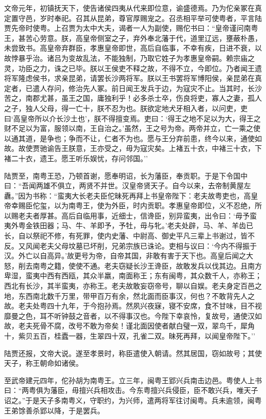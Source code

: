 \documentclass[]{article}
\begin{document}
文帝元年，初镇抚天下，使告诸侯四夷从代来即位意，谕盛德焉。乃为佗亲冢在真定置守邑，岁时奉祀。召其从昆弟，尊官厚赐宠之。召丞相平举可使粤者，平言陆贾先帝时使粤。上召贾为太中大夫，谒者一人为副使，赐佗书曰：``皇帝谨问南粤王，甚苦心劳意。朕，高皇帝侧室之子，弃外奉北藩于代，道里辽远，壅蔽朴愚，未尝致书。高皇帝弃群臣，孝惠皇帝即世，高后自临事，不幸有疾，日进不衰，以故悖暴乎治。诸吕为变故乱法，不能独制，乃取它姓子为孝惠皇帝嗣。赖宗庙之灵，功臣之力，诛之已毕。朕以王侯吏不释之故，不得不立，今即位。乃者闻王遗将军隆虑侯书，求亲昆弟，请罢长沙两将军。朕以王书罢将军博阳侯，亲昆弟在真定者，已遣人存问，修治先人冢。前日闻王发兵于边，为寇灾不止。当其时，长沙苦之，南郡尤甚，虽王之国，庸独利乎！必多杀士卒，伤良将吏，寡人之妻，孤人之子，独人父母，得一亡十，朕不忍为也。朕欲定地犬牙相入者，以问吏，吏曰`高皇帝所以介长沙土也'，朕不得擅变焉。吏曰：`得王之地不足以为大，得王之财不足以为富，服领以南，王自治之。'虽然，王之号为帝。两帝并立，亡一乘之使以通其道，是争也；争而不让，仁者不为也。愿与王分弃前患，终今以来，通使如故。故使贾驰谕告王朕意，王亦受之，毋为寇灾矣。上褚五十衣，中褚三十衣，下褚二十衣，遗王。愿王听乐娱忧，存问邻国。''

陆贾至，南粤王恐，乃顿首谢，愿奉明诏，长为藩臣，奉贡职。于是下令国中曰：``吾闻两雄不俱立，两贤不并世。汉皇帝贤天子。自今以来，去帝制黄屋左纛。''因为书称：``蛮夷大长老夫臣佗昧死再拜上书皇帝陛下：老夫故粤吏也，高皇帝幸赐臣佗玺，以为南粤王，使为外臣，时内贡职。孝惠皇帝即位，义不忍绝，所以赐老夫者厚甚。高后自临用事，近细士，信谗臣，别异蛮夷，出令曰：`毋予蛮夷外粤金铁田器；马、牛、羊即予，予牡，毋与牝。'老夫处辟，马、羊、羊齿已长，自以祭祀不修，有死罪，使内史藩、中尉高、御史平凡三辈上书谢过，皆不反。又风闻老夫父母坟墓已坏削，兄弟宗族已诛论。吏相与议曰：`今内不得振于汉。外亡以自高异。'故更号为帝，自帝其国，非敢有害于天下也。高皇后闻之大怒，削去南粤之籍，使使不通。老夫窃疑长沙王谗臣，故敢发兵以伐其边。且南方卑湿，蛮夷中西有西瓯，其众半羸，南面称王；东有闽粤，其众数千人，亦称王；西北有长沙，其半蛮夷，亦称王。老夫故敢妄窃帝号，聊以自娱。老夫身定百邑之地，东西南北数千万里，带甲百万有余，然北面而臣事汉，何也？不敢背先人之故。老夫处粤四十九年，于今抱孙焉。然夙兴夜寐，寝不安席，食不甘味，目不视靡曼之色，耳不听钟鼓之音者，以不得事汉也。今陛下幸哀怜，复故号，通使汉如故，老夫死骨不腐，改号不敢为帝矣！谨北面因使者献白璧一双，翠鸟千，犀角十，紫贝五百，桂蠹一器，生翠四十双，孔雀二双。昧死再拜，以闻皇帝陛下。''

陆贾还报，文帝大说。遂至孝景时，称臣遣使入朝请。然其居国，窃如故号；其使天子，称王朝命如诸侯。

至武帝建元四年，佗孙胡为南粤王。立三年，闽粤王郢兴兵南击边邑。粤使人上书曰：``两粤俱为藩臣，毋擅兴兵相攻击。今东粤擅兴兵侵臣，臣不敢兴兵，唯天子诏之。''于是天子多南粤义，守职约，为兴师，遣两将军往讨闽粤。兵未逾领，闽粤王弟馀善杀郢以降，于是罢兵。
\end{document}
